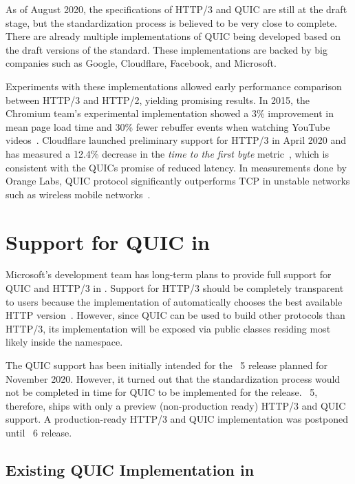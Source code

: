 As of August 2020, the specifications of HTTP/3 and QUIC are still at the draft stage, but the
standardization process is believed to be very close to complete. There are already multiple
implementations of QUIC being developed based on the draft versions of the standard. These
implementations are backed by big companies such as Google, Cloudflare, Facebook, and Microsoft.

Experiments with these implementations allowed early performance comparison between HTTP/3 and
HTTP/2, yielding promising results. In 2015, the Chromium team's experimental implementation showed
a 3\% improvement in mean page load time and 30\% fewer rebuffer events when watching YouTube
videos~\cite{Wilk2015}. Cloudflare launched preliminary support for HTTP/3 in April 2020 and has
measured a 12.4\% decrease in the \textit{time to the first byte} metric~\cite{Tellakula2020}, which
is consistent with the QUICs promise of reduced latency. In measurements done by Orange Labs, QUIC
protocol significantly outperforms TCP in unstable networks such as wireless mobile
networks~\cite{Cook2017}.

\section{Support for QUIC in \dotnet{}}

Microsoft's \dotnet{} development team has long-term plans to provide full support for QUIC and
HTTP/3 in \dotnet{}. Support for HTTP/3 should be completely transparent to users because the
implementation of  automatically chooses the best available HTTP
version~\cite{HttpClientDocs}. However, since QUIC can be used to build other protocols than HTTP/3,
its implementation will be exposed via public classes residing most likely inside the
 namespace.

The QUIC support has been initially intended for the \dotnet{}~5 release planned for November 2020.
However, it turned out that the standardization process would not be completed in time for QUIC to
be implemented for the release. \dotnet{}~5, therefore, ships with only a preview (non-production
ready) HTTP/3 and QUIC support. A production-ready HTTP/3 and QUIC implementation was postponed
until \dotnet{}~6 release.

\subsection*{Existing QUIC Implementation in \dotnet{}}


